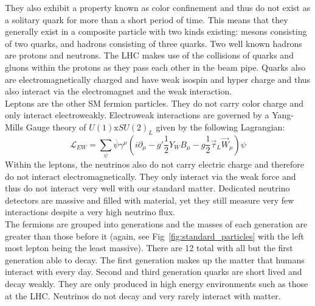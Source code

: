 They also exhibit a property known as color confinement and thus do not exist as a solitary quark for more than a short period of time. This means that they generally exist in a composite particle with two kinds existing: mesons consisting of two quarks, and hadrons consisting of three quarks. Two well known hadrons are protons and neutrons. The LHC makes use of the collisions of quarks and gluons within the protons as they pass each other in the beam pipe. Quarks also are electromagnetically charged and have weak isospin and hyper charge and thus also interact via the electromagnet and the weak interaction.\\

Leptons are the other SM fermion particles. They do not carry color charge and only interact electroweakly. Electroweak interactions are governed by a Yang-Mills Gauge theory of $U(1)\mathrm{x}SU(2)_L$ given by the following Lagrangian:
\begin{equation}
\mathcal{L}_{EW}=\displaystyle\sum_{\psi} \overline{\psi}\gamma^\mu ( i\partial_\mu - g' \frac{1}{2} Y_W B_\mu - g\frac{1}{2} \vec{\tau}_L\vec{W}_\mu)\psi
\end{equation}
Within the leptons, the neutrinos also do not carry electric charge and therefore do not interact electromagnetically. They only interact via the weak force and thus do not interact very well with our standard matter. Dedicated neutrino detectors are massive and filled with material, yet they still measure very few interactions despite a very high neutrino flux.\\

The fermions are grouped into generations and the masses of each generation are greater than those before it (again, see Fig~\ref{fig:standard_particles} with the left most lepton being the least massive). There are 12 total with all but the first generation able to decay. The first generation makes up the matter that humans interact with every day. Second and third generation quarks are short lived and decay weakly. They are only produced in high energy environments such as those at the LHC. Neutrinos do not decay and very rarely interact with matter.\\




